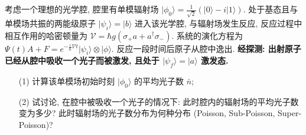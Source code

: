 \documentclass{assignment}
\begin{document}
\begin{prob}[20 分]
    考虑一个理想的光学腔, 腔里有单模辐射场 $\lvert\phi_0\rangle=\frac{1}{\sqrt{2}}(\lvert 0\rangle-i\lvert 1\rangle)$. 处于基态且与单模场共振的两能级原子 $\lvert\psi_i\rangle=\lvert b\rangle$ 进入该光学腔, 与辐射场发生反应, 反应过程中相互作用的哈密顿量为 $\mathscr{V}=\hbar g(\sigma_+a+a^{\dagger}\sigma_-)$. 系统的演化方程为 $\Psi(t){A+F}=e^{-\frac{i}{\hbar}\mathscr{V}t}\lvert\psi_i\rangle\otimes\lvert\phi\rangle$. 反应一段时间后原子从腔中逸出. \textbf{经探测: 出射原子已经从腔中吸收一个光子而被激发, 且处于 $\lvert\psi_f\rangle=\lvert a\rangle$ 激发态.}
    \begin{itemize}
        \item[(1)] 计算该单模场初始时刻 $\lvert\phi_0\rangle$ 的平均光子数 $\bar{n}$;
        \item[(2)] 试讨论, 在腔中被吸收一个光子的情况下: 此时腔内的辐射场的平均光子数变为多少? 此时辐射场的光子数分布为何种分布 (Poisson, Sub-Poisson, Super-Poisson)?
    \end{itemize}
\end{prob}
\end{document}
